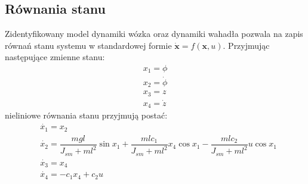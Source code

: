 \subsection{Równania stanu}
Zidentyfikowany model dynamiki wózka oraz dynamiki wahadła pozwala na zapis równań stanu systemu w standardowej formie $\dot{\textbf{x}}=f(\textbf{x},u)$. Przyjmując następujące zmienne stanu:
\begin{equation}
\label{eq:rStan}
\begin{aligned}
x_{1} = \phi \\
x_{2} = \dot{\phi} \\
x_{3} = z\\
x_{4} = \dot{z}
\end{aligned}
\end{equation}
nieliniowe równania stanu przyjmują postać:
\begin{equation}
\label{eq:rStan}
\begin{aligned}
&\dot{x_{1}} = x_2 \\
&\dot{x_{2}} = \dfrac{mgl}{J_{sm}+ml^2}\sin x_1+\dfrac{mlc_1}{J_{sm}+ml^2}x_4\cos x_1-\dfrac{mlc_2}{J_{sm}+ml^2}u\cos x_1 \\
&\dot{x_{3}} = x_4\\
&\dot{x_{4}} = -c_1x_4+c_2u
\end{aligned}
\end{equation}
